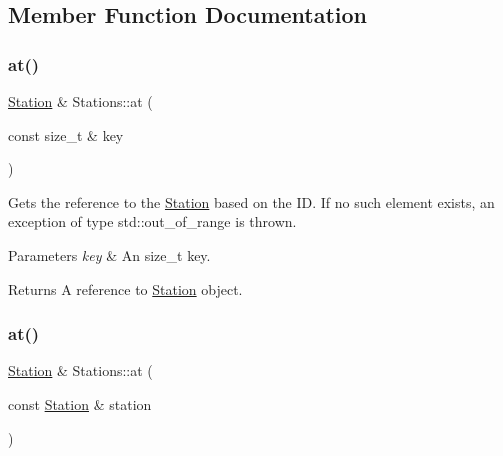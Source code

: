 \subsection{Member Function Documentation}
\mbox{\label{class_stations_a1d2abb378db9aa8deb9f7b54aefac2dd}} 
\subsubsection{\texorpdfstring{at()}{at()}\hspace{0.1cm}{\footnotesize\ttfamily [1/4]}}
{\footnotesize\ttfamily \mbox{\hyperlink{class_station}{Station}} \& Stations\+::at (\begin{DoxyParamCaption}\item[{const size\+\_\+t \&}]{key }\end{DoxyParamCaption})}

Gets the reference to the \mbox{\hyperlink{class_station}{Station}} based on the ID. If no such element exists, an exception of type std\+::out\+\_\+of\+\_\+range is thrown.


\begin{DoxyParams}{Parameters}
{\em key} & An size\+\_\+t key. \\
\hline
\end{DoxyParams}
\begin{DoxyReturn}{Returns}
A reference to \mbox{\hyperlink{class_station}{Station}} object. 
\end{DoxyReturn}
\mbox{\label{class_stations_a0db00fc62fdeebde93f2624477074087}} 
\subsubsection{\texorpdfstring{at()}{at()}\hspace{0.1cm}{\footnotesize\ttfamily [2/4]}}
{\footnotesize\ttfamily \mbox{\hyperlink{class_station}{Station}} \& Stations\+::at (\begin{DoxyParamCaption}\item[{const \mbox{\hyperlink{class_station}{Station}} \&}]{station }\end{DoxyParamCaption})}

\mbox{\label{class_stations_ab785e4995153a682ac3fd739b99e8db3}} 
